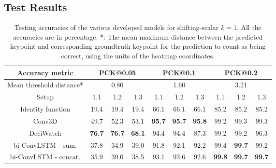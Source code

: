 \documentclass[./main.tex]{subfiles}
\begin{document}
\subsection{Test Results}
\begin{table}[htbp]
    \begin{tabular}{c||ccc|ccc|ccc}
        \hline
        Accuracy metric & \multicolumn{3}{c}{PCK@0.05} & \multicolumn{3}{c}{PCK@0.1} & \multicolumn{3}{c}{PCK@0.2} \\
        \hline
        Mean threshold distance* & \multicolumn{3}{c}{0.80} & \multicolumn{3}{c}{1.60} & \multicolumn{3}{c}{3.21} \\
        \hline
        Setup & 1.1 & 1.2 & 1.3 & 1.1 & 1.2 & 1.3 & 1.1 & 1.2 & 1.3 \\
        \hline
        \hline
        Identity function & 19.4 & 19.4 & 19.4 & 66.1 & 66.1 & 66.1 & 85.2 & 85.2 & 85.2 \\
        Conv3D & 49.7 & 52.3 & 53.1 & \textbf{95.7} & \textbf{95.7} & \textbf{95.8} & 99.2 & 99.3 & 99.3 \\
        DeciWatch & \textbf{76.7} & \textbf{76.7} & \textbf{68.1} & 94.4 & 94.4 & 87.3 & 99.2 & 99.2 & 96.3 \\
        bi-ConvLSTM - sum. & 37.8 & 34.9 & 39.0 & 91.8 & 92.1 & 92.2 & 99.4 & \textbf{99.7} & 99.2 \\
        bi-ConvLSTM - concat. & 35.9 & 39.0 & 38.5 & 93.1 & 93.6 & 92.6 & \textbf{99.8} & \textbf{99.7} & \textbf{99.7} \\
        \hline
    \end{tabular}
    \caption{Testing accuracies of the various developed models for shifting-scalar $k = 1$. All the accuracies are in percentage. *: The mean maximum distance between the predicted keypoint and corresponding groundtruth keypoint for the prediction to count as being correct, using the units of the heatmap coordinates.}
    \label{tab:finetune_test_accs_1}
\end{table}
\end{document}
